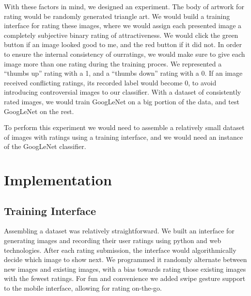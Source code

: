\documentclass[midd]{thesis}
\begin{document}
With these factors in mind, we designed an experiment. The body of artwork for rating would be randomly generated triangle art. We would build a training interface for rating these images, where we would assign each presented image a completely subjective binary rating of attractiveness. We would click the green button if an image looked good to me, and the red button if it did not. In order to ensure the internal consistency of ourratings, we would make sure to give each image more than one rating during the training proces. We represented a ``thumbs up'' rating with a 1, and a ``thumbs down'' rating with a 0. If an image received conflicting ratings, its recorded label would become 0, to avoid introducing controversial images to our classifier. With a dataset of consistently rated images, we would train GoogLeNet on a big portion of the data, and test GoogLeNet on the rest.

To perform this experiment we would need to assemble a relatively small dataset of images with ratings using a training interface, and we would need an instance of the GoogLeNet classifier.

%

\chapter{Implementation}


\section{Training Interface}

Assembling a dataset was relatively straightforward. We built an interface for generating images and recording their user ratings using python and web technologies. After each rating submission, the interface would algorithmically decide which image to show next. We programmed it randomly alternate between new images and existing images, with a bias towards rating those existing images with the fewest ratings.
For fun and convenience we added swipe gesture support to the mobile interface, allowing for rating on-the-go.
\end{document}
